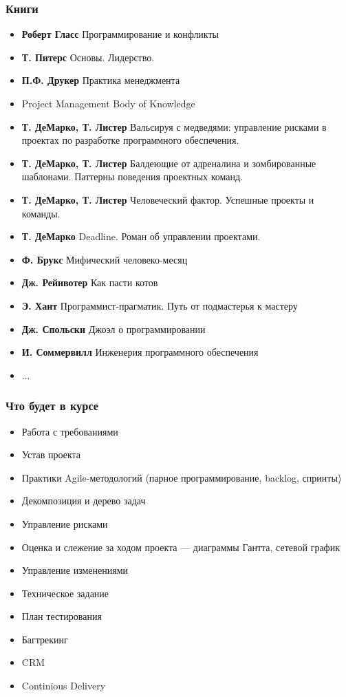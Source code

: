 \documentclass[xetex,mathserif,serif]{beamer}
\begin{document}
	\begin{frame}
		\frametitle{Книги}
		\begin{footnotesize}
			\begin{itemize}
				\item \textbf{Роберт Гласс} Программирование и конфликты
				\item \textbf{Т. Питерс} Основы. Лидерство.
				\item \textbf{П.Ф. Друкер} Практика менеджмента
				\item Project Management Body of Knowledge
				\item \textbf{Т. ДеМарко, Т. Листер} Вальсируя с медведями: управление рисками в проектах по разработке программного обеспечения.
				\item \textbf{Т. ДеМарко, Т. Листер} Балдеющие от адреналина и зомбированные шаблонами. Паттерны поведения проектных команд.
				\item \textbf{Т. ДеМарко, Т. Листер} Человеческий фактор. Успешные проекты и команды.
				\item \textbf{Т. ДеМарко} Deadline. Роман об управлении проектами.
				\item \textbf{Ф. Брукс} Мифический человеко-месяц
				\item \textbf{Дж. Рейнвотер} Как пасти котов
				\item \textbf{Э. Хант} Программист-прагматик. Путь от подмастерья к мастеру
				\item \textbf{Дж. Спольски} Джоэл о программировании
				\item \textbf{И. Соммервилл} Инженерия программного обеспечения
				\item ...
			\end{itemize}
		\end{footnotesize}
	\end{frame}

	\begin{frame}
		\frametitle{Что будет в курсе}
		\begin{footnotesize}
			\begin{itemize}
				\item Работа с требованиями
				\item Устав проекта
				\item Практики Agile-методологий (парное программирование, backlog, спринты)
				\item Декомпозиция и дерево задач
				\item Управление рисками
				\item Оценка и слежение за ходом проекта --- диаграммы Гантта, сетевой график
				\item Управление изменениями
				\item Техническое задание
				\item План тестирования
				\item Багтрекинг
				\item CRM
				\item Continious Delivery
			\end{itemize}
		\end{footnotesize}
	\end{frame}
\end{document}
